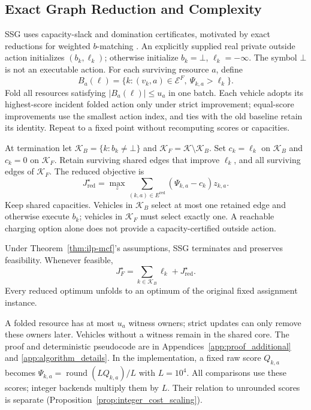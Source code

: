 \subsection{Exact Graph Reduction and Complexity}
\label{sec:exact_scaling}
SSG uses capacity-slack and domination certificates, motivated by
exact reductions for weighted $b$-matching
\citep{grossmann2026engineering}. An explicitly supplied real private
outside action initializes $(b_k,\ell_k)$; otherwise initialize
$b_k=\bot$, $\ell_k=-\infty$. The symbol $\bot$ is not an executable
action. For each surviving resource $a$, define
\begin{equation}
B_a(\ell)=\{k:(v_k,a)\in\mathcal E^F,\ \Psi_{k,a}>\ell_k\}.
\label{eq:positive_degree}
\end{equation}
Fold all resources satisfying $|B_a(\ell)|\le u_a$ in one batch.
Each vehicle adopts its highest-score incident folded action only
under strict improvement; equal-score improvements use the smallest
action index, and ties with the old baseline retain its identity.
Repeat to a fixed point without recomputing scores or capacities.

At termination let $\mathcal K_B=\{k:b_k\ne\bot\}$ and
$\mathcal K_F=\mathcal K\setminus\mathcal K_B$. Set $c_k=\ell_k$
on $\mathcal K_B$ and $c_k=0$ on $\mathcal K_F$. Retain surviving
shared edges that improve $\ell_k$, and all surviving edges of
$\mathcal K_F$. The reduced objective is
\begin{equation}
J_{\mathrm{red}}^\star=
\max_z\sum_{(k,a)\in E^{\mathrm{red}}}(\Psi_{k,a}-c_k)z_{k,a}.
\label{eq:reduced_objective}
\end{equation}
Keep shared capacities. Vehicles in $\mathcal K_B$ select at most one
retained edge and otherwise execute $b_k$; vehicles in $\mathcal K_F$
must select exactly one. A reachable charging option alone does not
provide a capacity-certified outside action.

\begin{thm}
\label{thm:exact_scaling}
Under Theorem~\ref{thm:ilp-mcf}'s assumptions, SSG terminates and
preserves feasibility. Whenever feasible,
\begin{equation}
J_F^\star=\sum_{k\in\mathcal K_B}\ell_k+J_{\mathrm{red}}^\star.
\label{eq:exact_scaling_identity}
\end{equation}
Every reduced optimum unfolds to an optimum of the original fixed
assignment instance.
\end{thm}

A folded resource has at most $u_a$ witness owners; strict updates can
only remove these owners later. Vehicles without a witness remain in
the shared core. The proof and deterministic pseudocode are in
Appendices~\ref{app:proof_additional} and
\ref{app:algorithm_details}. In the implementation, a fixed raw score
$Q_{k,a}$ becomes $\Psi_{k,a}=\operatorname{round}(LQ_{k,a})/L$
with $L=10^4$. All comparisons use these scores; integer backends
multiply them by $L$. Their relation to unrounded scores is
separate (Proposition~\ref{prop:integer_cost_scaling}).

